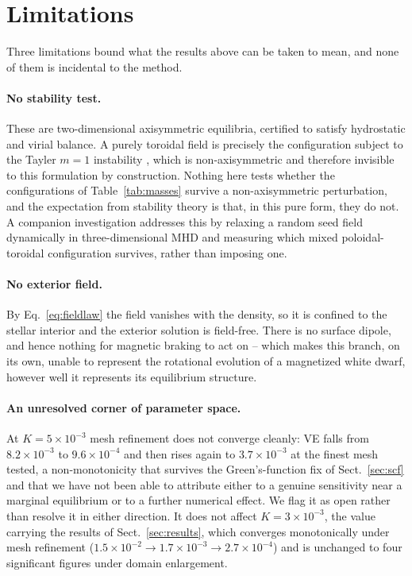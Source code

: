 \documentclass{aa}
\begin{document}

\section{Limitations}
\label{sec:limitations}

Three limitations bound what the results above can be taken to mean,
and none of them is incidental to the method.

\paragraph{No stability test.} These are two-dimensional axisymmetric
equilibria, certified to satisfy hydrostatic and virial balance. A
purely toroidal field is precisely the configuration subject to the
Tayler $m=1$ instability \citep{tayler1973,markey1973}, which is
non-axisymmetric and therefore invisible to this formulation by
construction. Nothing here tests whether the configurations of
Table~\ref{tab:masses} survive a non-axisymmetric perturbation, and the
expectation from stability theory is that, in this pure form, they do
not. A companion investigation addresses this by relaxing a random
seed field dynamically in three-dimensional MHD and measuring which
mixed poloidal-toroidal configuration survives, rather than imposing
one.

\paragraph{No exterior field.} By Eq.~\ref{eq:fieldlaw} the field
vanishes with the density, so it is confined to the stellar interior
and the exterior solution is field-free. There is no surface dipole,
and hence nothing for magnetic braking to act on -- which makes this
branch, on its own, unable to represent the rotational evolution of a
magnetized white dwarf, however well it represents its equilibrium
structure.

\paragraph{An unresolved corner of parameter space.} At
$K = 5\times10^{-3}$ mesh refinement does not converge cleanly: VE
falls from $8.2\times10^{-3}$ to $9.6\times10^{-4}$ and then rises
again to $3.7\times10^{-3}$ at the finest mesh tested, a
non-monotonicity that survives the Green's-function fix of
Sect.~\ref{sec:scf} and that we have not been able to attribute either
to a genuine sensitivity near a marginal equilibrium or to a further
numerical effect. We flag it as open rather than resolve it in either
direction. It does not affect $K = 3\times10^{-3}$, the value carrying
the results of Sect.~\ref{sec:results}, which converges monotonically
under mesh refinement ($1.5\times10^{-2} \rightarrow 1.7\times10^{-3}
\rightarrow 2.7\times10^{-4}$) and is unchanged to four significant
figures under domain enlargement.
\end{document}
